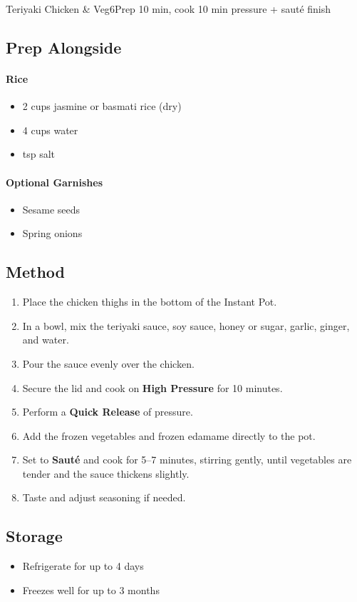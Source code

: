 \begin{recipebox}{Teriyaki Chicken \& Veg}{6}{Prep 10 min, cook 10 min pressure + sauté finish}
\subsection*{Prep Alongside}

\paragraph{Rice}
\begin{itemize}
    \item 2 cups jasmine or basmati rice (dry)
    \item 4 cups water
    \item {} tsp salt
\end{itemize}

\paragraph{Optional Garnishes}
\begin{itemize}
    \item Sesame seeds
    \item Spring onions
\end{itemize}

\subsection*{Method}
\begin{enumerate}
    \item Place the chicken thighs in the bottom of the Instant Pot.
    \item In a bowl, mix the teriyaki sauce, soy sauce, honey or sugar, garlic, ginger, and water.
    \item Pour the sauce evenly over the chicken.
    \item Secure the lid and cook on \textbf{High Pressure} for 10 minutes.
    \item Perform a \textbf{Quick Release} of pressure.
    \item Add the frozen vegetables and frozen edamame directly to the pot.
    \item Set to \textbf{Sauté} and cook for 5--7 minutes, stirring gently, until vegetables are tender and the sauce thickens slightly.
    \item Taste and adjust seasoning if needed.
\end{enumerate}

\subsection*{Storage}
\begin{itemize}
    \item Refrigerate for up to 4 days
    \item Freezes well for up to 3 months
\end{itemize}


\end{recipebox}

